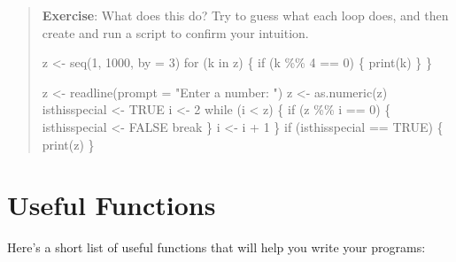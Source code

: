 \documentclass[
  letterpaper,
  DIV=11,
  numbers=noendperiod]{scrreprt}
\newenvironment{Shaded}{\begin{snugshade}}{\end{snugshade}}
\newcommand{\AttributeTok}[1]{\textcolor[rgb]{0.40,0.45,0.13}{#1}}
\newcommand{\ConstantTok}[1]{\textcolor[rgb]{0.56,0.35,0.01}{#1}}
\newcommand{\ControlFlowTok}[1]{\textcolor[rgb]{0.00,0.23,0.31}{#1}}
\newcommand{\DecValTok}[1]{\textcolor[rgb]{0.68,0.00,0.00}{#1}}
\newcommand{\FunctionTok}[1]{\textcolor[rgb]{0.28,0.35,0.67}{#1}}
\newcommand{\NormalTok}[1]{\textcolor[rgb]{0.00,0.23,0.31}{#1}}
\newcommand{\OtherTok}[1]{\textcolor[rgb]{0.00,0.23,0.31}{#1}}
\newcommand{\SpecialCharTok}[1]{\textcolor[rgb]{0.37,0.37,0.37}{#1}}
\newcommand{\StringTok}[1]{\textcolor[rgb]{0.13,0.47,0.30}{#1}}
\begin{document}
\begin{quote}
\textbf{Exercise}: What does this do? Try to guess what each loop does,
and then create and run a script to confirm your intuition.

\begin{Shaded}
\begin{Highlighting}[]
\NormalTok{z }\OtherTok{\textless{}{-}} \FunctionTok{seq}\NormalTok{(}\DecValTok{1}\NormalTok{, }\DecValTok{1000}\NormalTok{, }\AttributeTok{by =} \DecValTok{3}\NormalTok{)}
\ControlFlowTok{for}\NormalTok{ (k }\ControlFlowTok{in}\NormalTok{ z) \{}
  \ControlFlowTok{if}\NormalTok{ (k }\SpecialCharTok{\%\%} \DecValTok{4} \SpecialCharTok{==} \DecValTok{0}\NormalTok{) \{}
     \FunctionTok{print}\NormalTok{(k)}
\NormalTok{  \}}
\NormalTok{\}}
\end{Highlighting}
\end{Shaded}

\begin{Shaded}
\begin{Highlighting}[]
\NormalTok{z }\OtherTok{\textless{}{-}} \FunctionTok{readline}\NormalTok{(}\AttributeTok{prompt =} \StringTok{"Enter a number: "}\NormalTok{)}
\NormalTok{z }\OtherTok{\textless{}{-}} \FunctionTok{as.numeric}\NormalTok{(z)}
\NormalTok{isthisspecial }\OtherTok{\textless{}{-}} \ConstantTok{TRUE}
\NormalTok{i }\OtherTok{\textless{}{-}} \DecValTok{2}
\ControlFlowTok{while}\NormalTok{ (i }\SpecialCharTok{\textless{}}\NormalTok{ z) \{}
  \ControlFlowTok{if}\NormalTok{ (z }\SpecialCharTok{\%\%}\NormalTok{ i }\SpecialCharTok{==} \DecValTok{0}\NormalTok{) \{}
\NormalTok{     isthisspecial }\OtherTok{\textless{}{-}} \ConstantTok{FALSE}
     \ControlFlowTok{break}
\NormalTok{  \}}
\NormalTok{  i }\OtherTok{\textless{}{-}}\NormalTok{ i }\SpecialCharTok{+} \DecValTok{1}
\NormalTok{\}}
\ControlFlowTok{if}\NormalTok{ (isthisspecial }\SpecialCharTok{==} \ConstantTok{TRUE}\NormalTok{) \{}
  \FunctionTok{print}\NormalTok{(z)}
\NormalTok{\}}
\end{Highlighting}
\end{Shaded}
\end{quote}

\hypertarget{useful-functions}{%
\section{Useful Functions}\label{useful-functions}}

Here's a short list of useful functions that will help you write your
programs:
\end{document}
